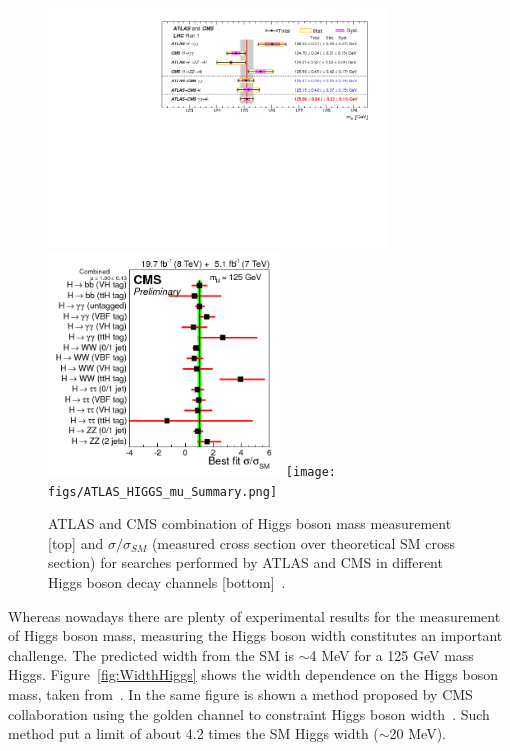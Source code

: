 \begin{figure}[!Hhtbp]
  \begin{center}
    \includegraphics[trim=10cm 7cm 1cm 1cm, clip=true, width=0.8\textwidth]{figs/LHC_combined_obs_unblind_summary_a1_final.png}
    \includegraphics[width=0.55\textwidth]{figs/sqr_mlz_ccc_mH125.png}
    \texttt{[image: figs/ATLAS\_HIGGS\_mu\_Summary.png]}
    \caption{ATLAS and CMS combination of Higgs boson mass measurement [top] and $\sigma/\sigma_{SM}$ (measured cross section over theoretical SM cross section) for searches performed by ATLAS and CMS in different Higgs boson decay channels [bottom]~\cite{Aad:2015zhl,CMS:2014ega,ATLAS-CONF-2015-007}.}
    \label{fig:HiggsMass}
  \end{center}
\end{figure}

Whereas nowadays there are plenty of experimental results for the measurement of Higgs boson mass, measuring the Higgs boson width constitutes an important challenge. The predicted width from the SM is $\sim$4 MeV for a 125 GeV mass Higgs. Figure~\ref{fig:WidthHiggs} shows the width dependence on the Higgs boson mass, taken from~\cite{Dittmaier:2011ti, Dittmaier:2012vm, Heinemeyer:2013tqa, HIGGSXSWG}. In the same figure is shown a method proposed by CMS collaboration using the golden channel to constraint Higgs boson width~\cite{Khachatryan:2014iha}. Such method put a limit of about 4.2 times the SM Higgs width ($\sim$20 MeV).

